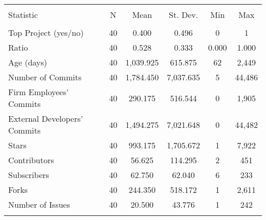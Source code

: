 \begin{tabular}{@{\extracolsep{5pt}}lccccc}
\\[-1.8ex]\hline
\hline \\[-1.8ex]
Statistic & \multicolumn{1}{c}{N} & \multicolumn{1}{c}{Mean} & \multicolumn{1}{c}{St. Dev.} & \multicolumn{1}{c}{Min} & \multicolumn{1}{c}{Max} \\
\hline \\[-1.8ex]
Top Project (yes/no) & 40 & 0.400 & 0.496 & 0 & 1 \\
Ratio & 40 & 0.528 & 0.333 & 0.000 & 1.000 \\
Age (days) & 40 & 1,039.925 & 615.875 & 62 & 2,449 \\
Number of Commits & 40 & 1,784.450 & 7,037.635 & 5 & 44,486 \\
Firm Employees' Commits & 40 & 290.175 & 516.544 & 0 & 1,905 \\
External Developers' Commits & 40 & 1,494.275 & 7,021.648 & 0 & 44,482 \\
Stars & 40 & 993.175 & 1,705.672 & 1 & 7,922 \\
Contributors & 40 & 56.625 & 114.295 & 2 & 451 \\
Subscribers & 40 & 62.750 & 62.040 & 6 & 233 \\
Forks & 40 & 244.350 & 518.172 & 1 & 2,611 \\
Number of Issues & 40 & 20.500 & 43.776 & 1 & 242 \\
\hline \\[-1.8ex]
\end{tabular}
